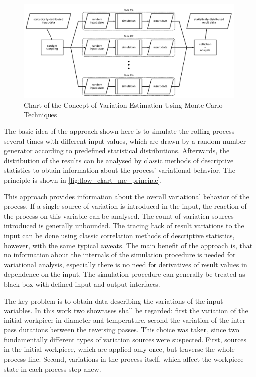\begin{figure}
    \centering
    \includegraphics[width=\linewidth]{img/flow_chart_mc_principle}
    \caption{Chart of the Concept of Variation Estimation Using Monte Carlo Techniques}
    \label{fig:flow_chart_mc_principle}
\end{figure}

The basic idea of the approach shown here is to simulate the rolling process several times with different input values, which are drawn by a random number generator according to predefined statistical distributions.
Afterwards, the distribution of the results can be analysed by classic methods of descriptive statistics to obtain information about the process' variational behavior.
The principle is shown in \autoref{fig:flow_chart_mc_principle}.

This approach provides information about the overall variational behavior of the process.
If a single source of variation is introduced in the input, the reaction of the process on this variable can be analysed.
The count of variation sources introduced is generally unbounded.
The tracing back of result variations to the input can be done using classic correlation methods of descriptive statistics, however, with the same typical caveats.
The main benefit of the approach is, that no information about the internals of the simulation procedure is needed for variational analysis, especially there is no need for derivatives of result values in dependence on the input.
The simulation procedure can generally be treated as black box with defined input and output interfaces.

The key problem is to obtain data describing the variations of the input variables.
In this work two showcases shall be regarded: first the variation of the initial workpiece in diameter and temperature,
second the variation of the inter-pass durations between the reversing passes.
This choice was taken, since two fundamentally different types of variation sources were suspected.
First, sources in the initial workpiece, which are applied only once, but traverse the whole process line.
Second, variations in the process itself, which affect the workpiece state in each process step anew.

